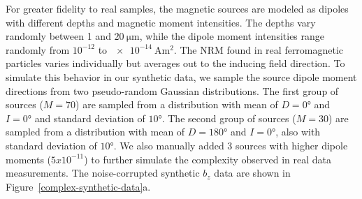 For greater fidelity to real samples, the magnetic sources are modeled as dipoles with different depths and magnetic moment intensities.
The depths vary randomly between 1 and $\qty{20}{\um}$, while the dipole moment intensities range randomly from $10^{-12}$ to $\qty{e-14}{\ampere\m\squared}$.
The NRM found in real ferromagnetic particles varies individually but averages out to the inducing field direction.
To simulate this behavior in our synthetic data, we sample the source dipole moment directions from two pseudo-random Gaussian distributions.
The first group of sources ($M = 70$) are sampled from a distribution  with mean of $D = \ang{0}$ and $I = \ang{0}$ and standard deviation of $\ang{10}$.
The second group of sources ($M = 30$) are sampled from a distribution with mean of $D = \ang{180}$ and $I = \ang{0}$, also with standard deviation of $\ang{10}$. We also manually added 3 sources with higher dipole moments ($5x10^{-11}$) to further simulate the complexity observed in real data measurements. The noise-corrupted synthetic $b_z$ data are shown in Figure~\ref{complex-synthetic-data}a.

